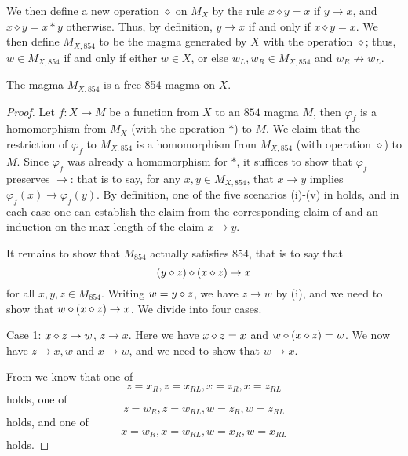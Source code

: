 We then define a new operation $\diamond$ on $M_X$ by the rule $x \diamond y = x$ if $y \to x$, and $x \diamond y = x*y$ otherwise. Thus, by definition, $y \to x$ if and only if $x \diamond y = x$.  We then define $M_{X,854}$ to be the magma generated by $X$ with the operation $\diamond$; thus, $w \in M_{X,854}$ if and only if either $w \in X$, or else $w_L, w_R \in M_{X,854}$ and $w_R \not \to w_L$.

\begin{theorem}\label{free-854}  The magma $M_{X,854}$ is a free 854 magma on $X$.
\end{theorem}

\begin{proof}  Let  $f: X \to M$ be a function from $X$ to an $854$ magma $M$, then $\varphi_f$ is a homomorphism from $M_X$ (with the operation $*$) to $M$.  We claim that the restriction of $\varphi_f$ to $M_{X,854}$ is a homomorphism from $M_{X,854}$ (with operation $\diamond$) to $M$.  Since $\varphi_f$ was already a homomorphism for $*$, it suffices to show that $\varphi_f$ preserves $\to$: that is to say, for any $x,y \in M_{X,854}$, that $x \to y$ implies $\varphi_f(x) \to \varphi_f(y)$.  By definition, one of the five scenarios (i)-(v) in  holds, and in each case one can establish the claim from the corresponding claim of  and an induction on the max-length of the claim $x \to y$.

It remains to show that $M_{854}$ actually satisfies 854, that is to say that
$$ (y \diamond z) \diamond (x \diamond z) \to x$$
for all $x,y,z \in M_{854}$.  Writing $w = y \diamond z$, we have $z \to w$ by (i), and we need to show that $w \diamond (x \diamond z) \to x$.  We divide into four cases.

Case 1: $x \diamond z \to w$, $z \to x$.  Here we have $x \diamond z = x$ and $w \diamond (x \diamond z) = w$.  We now have $z \to x,w$ and $x \to w$, and we need to show that $w \to x$.

From  we know that one of
\begin{equation}\label{one-1}
  z = x_R, z = x_{RL}, x = z_R, x = z_{RL}
\end{equation}
holds, one of
\begin{equation}\label{one-2}
  z = w_R, z = w_{RL}, w = z_R, w = z_{RL}
\end{equation}
holds, and one of
\begin{equation}\label{one-3}
  x = w_R, x = w_{RL}, w = x_R, w = x_{RL}
\end{equation}
holds.


\end{proof}

